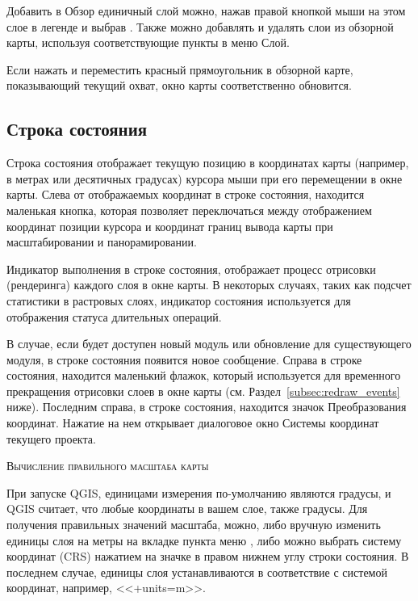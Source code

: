 Добавить в Обзор единичный слой можно, нажав правой кнопкой мыши на этом
слое в легенде и выбрав . Также можно
добавлять и удалять слои из обзорной карты, используя соответствующие
пункты в меню Слой.

Если нажать и переместить красный прямоугольник в обзорной карте,
показывающий текущий охват, окно карты соответственно обновится.

\subsection{Строка состояния}\label{label_statusbar}

Строка состояния отображает текущую позицию в координатах карты (например,
в метрах или десятичных градусах) курсора мыши при его перемещении в окне
карты. Слева от отображаемых координат в строке состояния, находится
маленькая кнопка, которая позволяет переключаться между отображением
координат позиции курсора и координат границ вывода карты при
масштабировании и панорамировании.

Индикатор выполнения в строке состояния, отображает процесс отрисовки
(рендеринга) каждого слоя в окне карты. В некоторых случаях, таких как
подсчет статистики в растровых слоях, индикатор состояния используется
для отображения статуса длительных операций.

В случае, если будет доступен новый модуль или обновление для
существующего модуля, в строке состояния появится новое сообщение. Справа
в строке состояния, находится маленький флажок, который используется для
временного прекращения отрисовки слоев в окне карты
(см. Раздел~\ref{subsec:redraw_events} ниже). Последним справа, в строке
состояния, находится значок Преобразования координат. Нажатие на нем
открывает диалоговое окно Системы координат текущего проекта.

\begin{Tip}\caption{\textsc{Вычисление правильного масштаба карты}}
При запуске QGIS, единицами измерения по-умолчанию являются градусы, и
QGIS считает, что любые координаты в вашем слое, также градусы. Для
получения правильных значений масштаба, можно, либо вручную изменить единицы
слоя на метры на вкладке  пункта меню 
\arrow {}, либо можно выбрать систему
координат (CRS) нажатием на значке
 в правом
нижнем углу строки состояния. В последнем случае, единицы слоя
устанавливаются в соответствие с системой координат, например, <<+units=m>>.
\end{Tip}

